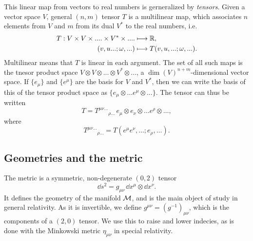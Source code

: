 This linear map from vectors to real numbers is gerneralized by \emph{tensors}.
Given a vector space $V$, general $(n, m)$ tensor $T$ is a multilinear map, which associates $n$ elements from $V$ and $m$ from its dual $V^*$ to the real numbers, i.e.
%
\begin{align}
    T: V \times V \times .... \times V^* \times .... &\longmapsto \mathbb{R}, \\
    (v, u...; \omega, ...) & \longmapsto T(v, u, ...; \omega, ...).
\end{align}
%
Multilinear means that $T$ is linear in each argument.
The set of all such maps is the tnesor product space $V\otimes V \otimes ... \otimes V^* \otimes ...$, a $\dim(V)^{n+m}$-dimensional vector space.
If $\{e_\mu\}$ and $\{e^\mu\}$ are the basis for $V$ and $V^*$, then we can write the basis of this of the tensor product space as $ \{e_\mu \otimes... e^\mu \otimes ... \}$.
The tensor can thus be written
%
\begin{equation}
    T = T^{\mu \nu\dots}{}_{\rho\dots} \, e_{\mu}\otimes e_\nu \otimes \dots e^\rho\otimes\dots, 
\end{equation}
%
where
%
\begin{equation}
    T^{\mu \nu\dots}{}_{\rho\dots} = T(e^\mu e^\nu, \dots; e_\rho, \dots).
\end{equation}


\subsection*{Geometries and the metric}

The metric is a symmetric, non-degenerate $(0, 2)$ tensor
%
\begin{equation}
    \dd s^2 = g_{\mu \nu} \, \dd x^\mu \otimes \dd x^\nu.
\end{equation}
%
It defines the geometry of the manifold $\mathcal{M}$, and is the main object of study in general relativity.
As it is invertible, we define $g^{\mu \nu} = (g^{-1})_{\mu \nu}$, which is the components of a $(2, 0)$ tensor.
We use this to raise and lower indecies, as is done with the Minkowski metric $\eta_{\mu \nu}$ in special relativity.


